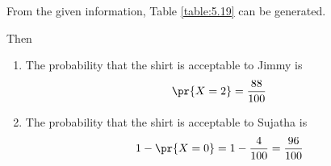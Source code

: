 From the given information, Table \ref{table:5.19} can be generated.
\begin{table}[!ht]
\centering
{}
\caption{Random variables}
\label{table:5.19}
\end{table}
Then
\begin{enumerate}
\item The probability that the shirt is acceptable to Jimmy is
\begin{align}
\pr{X=2}=\frac{88}{100}
\end{align}
%
\item The probability that the shirt is acceptable to Sujatha is
\begin{align}
1-\pr{X=0}=1-\frac{4}{100} = \frac{96}{100}
\end{align}

\end{enumerate}
